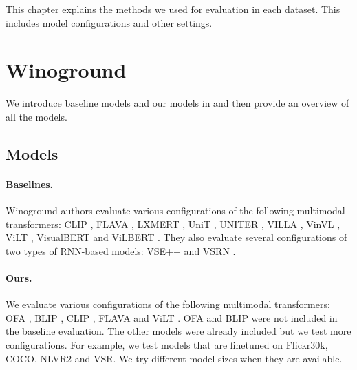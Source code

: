 This chapter explains the methods we used for evaluation in each dataset. This includes model configurations and other settings.

\section{Winoground}

We introduce baseline models and our models in  and then provide an overview of all the models.

\subsection{Models} \label{sec:wino_models}

\paragraph{Baselines.}
Winoground authors \cite{thrush2022winoground} evaluate various configurations of the following multimodal transformers: CLIP \cite{radford2021clip}, FLAVA \cite{singh2022flava}, LXMERT \cite{tan2020lxmert}, UniT \cite{hu2021unit}, UNITER \cite{chen2020uniter}, VILLA \cite{gan2020villa}, VinVL \cite{zhang2021vinvl}, ViLT \cite{kim2021vilt}, VisualBERT \cite{li2019visualbert} and ViLBERT \cite{lu2019vilbert}. They also evaluate several configurations of two types of RNN-based models: VSE++ \cite{faghri2018vse} and VSRN \cite{li2019vsrn}.

\paragraph{Ours.}
We evaluate various configurations of the following multimodal transformers: OFA \cite{wang2022unifying}, BLIP \cite{li2022blip}, CLIP \cite{radford2021clip}, FLAVA \cite{singh2022flava} and ViLT \cite{kim2021vilt}. OFA and BLIP were not included in the baseline evaluation. The other models were already included but we test more configurations. For example, we test models that are finetuned on Flickr30k, COCO, NLVR2 and VSR. We try different model sizes when they are available.

